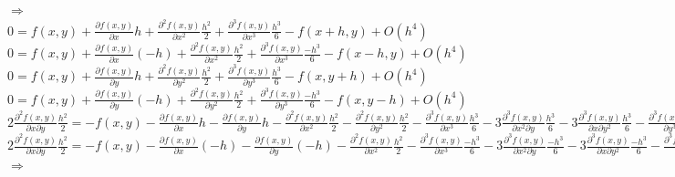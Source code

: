 \documentclass[12pt]{article}
\begin{document}
\begin{enumerate}[label=\bfseries Problem \arabic*:]
    $\Rightarrow$\\
   
    $0=f(x,y)+\frac{\partial f(x,y)}{\partial x}h+\frac{\partial^2 f(x,y)}{\partial x^2}\frac{h^2}{2}+\frac{\partial^3 f(x,y)}{\partial x^3}\frac{h^3}{6}-f(x+h,y)+O(h^4)$\\
    $0=f(x,y)+\frac{\partial f(x,y)}{\partial x}(-h)+\frac{\partial^2 f(x,y)}{\partial x^2}\frac{h^2}{2}+\frac{\partial^3 f(x,y)}{\partial x^3}\frac{-h^3}{6}-f(x-h,y)+O(h^4)$\\
    $0=f(x,y)+\frac{\partial f(x,y)}{\partial y}h+\frac{\partial^2 f(x,y)}{\partial y^2}\frac{h^2}{2}+\frac{\partial^3 f(x,y)}{\partial y^3}\frac{h^3}{6}-f(x,y+h)+O(h^4)$\\
    $0=f(x,y)+\frac{\partial f(x,y)}{\partial y}(-h)+\frac{\partial^2 f(x,y)}{\partial y^2}\frac{h^2}{2}+\frac{\partial^3 f(x,y)}{\partial y^3}\frac{-h^3}{6}-f(x,y-h)+O(h^4)$\\
    $2\frac{\partial^2 f(x,y)}{\partial x\partial y}\frac{h^2}{2}=-f(x,y)-\frac{\partial f(x,y)}{\partial x}h-\frac{\partial f(x,y)}{\partial y}h-\frac{\partial^2 f(x,y)}{\partial x^2}\frac{h^2}{2}-\frac{\partial^2 f(x,y)}{\partial y^2}\frac{h^2}{2}-\frac{\partial^3 f(x,y)}{\partial x^3}\frac{h^3}{6}-3\frac{\partial^3 f(x,y)}{\partial x^2 \partial y}\frac{h^3}{6}-3\frac{\partial^3 f(x,y)}{\partial x\partial y^2}\frac{h^3}{6}-\frac{\partial^3 f(x,y)}{\partial y^3}\frac{h^3}{6}+f(x+h,y+h)+O(h^4)$\\
    $2\frac{\partial^2 f(x,y)}{\partial x\partial y}\frac{h^2}{2}=-f(x,y)-\frac{\partial f(x,y)}{\partial x}(-h)-\frac{\partial f(x,y)}{\partial y}(-h)-\frac{\partial^2 f(x,y)}{\partial x^2}\frac{h^2}{2}-\frac{\partial^3 f(x,y)}{\partial x^3}\frac{-h^3}{6}-3\frac{\partial^3 f(x,y)}{\partial x^2 \partial y}\frac{-h^3}{6}-3\frac{\partial^3 f(x,y)}{\partial x\partial y^2}\frac{-h^3}{6}-\frac{\partial^3 f(x,y)}{\partial y^3}\frac{-h^3}{6}+f(x-h,y-h)+O(h^4)$\\
   
    $\Rightarrow$\\
   

\end{enumerate}
\end{document}
